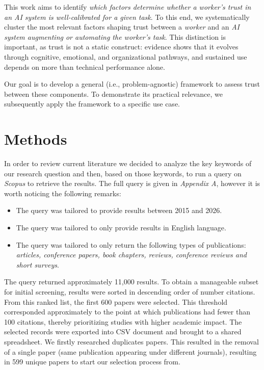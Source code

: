 \documentclass[sigconf]{acmart}
\begin{document}
This work aims to identify \emph{which factors determine whether a worker's trust in an AI system is well-calibrated for a given task}. To this end, we systematically cluster the most relevant factors shaping trust between a \emph{worker} and an \emph{AI system augmenting or automating the worker's task}. This distinction is important, as trust is not a static construct: evidence shows that it evolves through cognitive, emotional, and organizational pathways, and sustained use depends on more than technical performance alone.

Our goal is to develop a general (i.e., problem-agnostic) framework to assess trust between these components. To demonstrate its practical relevance, we subsequently apply the framework to a specific use case.


\section{Methods}

In order to review current literature we decided to analyze the key keywords of our research question and then, based on those keywords, to run a query on \emph{Scopus} to retrieve the results. The full query is given in \emph{Appendix A}, however it is worth noticing the following remarks:
\begin{itemize}
    \item The query was tailored to provide results between 2015 and 2026.
    \item The query was tailored to only provide results in English language.
    \item The query was tailored to only return the following types of publications: \emph{articles, conference papers, book chapters, reviews, conference reviews and short surveys}.
\end{itemize}

The query returned approximately 11{,}000 results. To obtain a manageable subset for initial screening, results were sorted in descending order of number citations. From this ranked list, the first 600 papers were selected. This threshold corresponded approximately to the point at which publications had fewer than 100 citations, thereby prioritizing studies with higher academic impact.
The selected records were exported into CSV document and brought to a shared spreadsheet. 
We firstly researched duplicates papers. This resulted in the removal of a single paper (same publication appearing under different journals), resulting in 599 unique papers to start our selection process from. 
\end{document}
